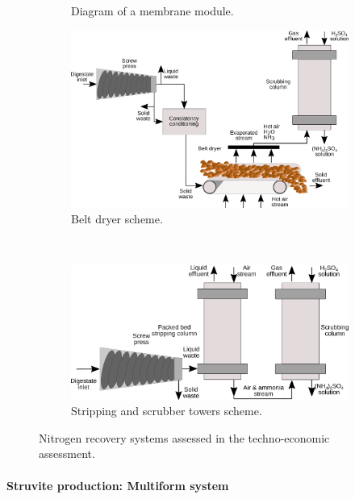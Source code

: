 \begin{refsection}[referencesCh6]
\begin{figure}
\begin{subfigure}{.5\textwidth}
	\caption{Diagram of a membrane module.}
	\label{fig:membrane_diagrams}
\end{subfigure}%
\begin{subfigure}{.5\textwidth}
	\centering
	\includegraphics[width=0.7\linewidth, trim={0cm 0cm 0cm 0cm},clip]{gfx/Chapter6/BeltDryerFinal3.pdf} 
	\caption{Belt dryer scheme.}
	\label{fig:BeltDryerScheme}
\end{subfigure}
\\
\centering
\begin{subfigure}{.4\textwidth}
\vspace{0.5cm}
\centering
	\includegraphics[width=0.75\linewidth, trim={0cm 0cm 0cm 0cm},clip]{gfx/Chapter6/StrippingScrubbing.pdf} 
	\caption{Stripping and scrubber towers scheme.}
	\label{fig:ScrubberScheme}
\end{subfigure}
\caption{Nitrogen recovery systems assessed in the techno-economic assessment.}
\label{fig:NRcoveryTechsDiagrams}
\end{figure}

\paragraph{\textbf{Struvite production: Multiform system}}


\end{refsection}
